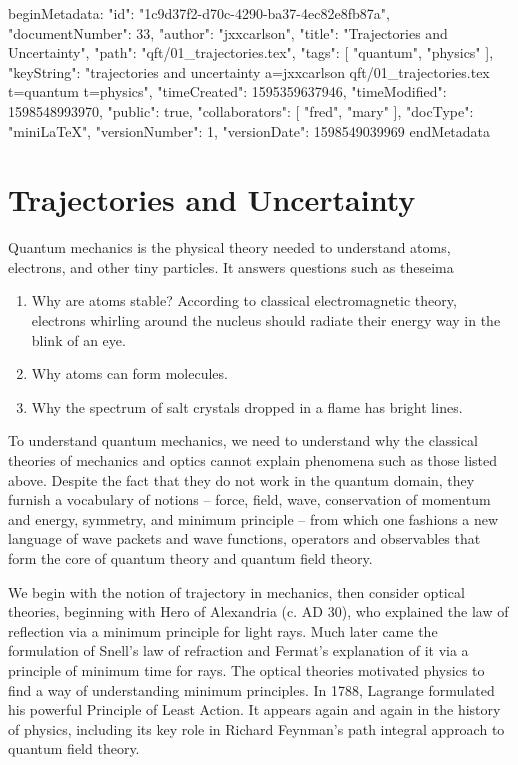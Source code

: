 beginMetadata:
{
    "id": "1c9d37f2-d70c-4290-ba37-4ec82e8fb87a",
    "documentNumber": 33,
    "author": "jxxcarlson",
    "title": "Trajectories and Uncertainty",
    "path": "qft/01_trajectories.tex",
    "tags": [
        "quantum",
        "physics"
    ],
    "keyString": "trajectories and uncertainty a=jxxcarlson qft/01_trajectories.tex t=quantum t=physics",
    "timeCreated": 1595359637946,
    "timeModified": 1598548993970,
    "public": true,
    "collaborators": [
        "fred",
        "mary"
    ],
    "docType": "miniLaTeX",
    "versionNumber": 1,
    "versionDate": 1598549039969
}
endMetadata

\maintableofcontents


\section{Trajectories and Uncertainty}


\innertableofcontents


Quantum mechanics is the physical theory needed to understand atoms, electrons, and other tiny particles.  It answers questions such as theseima

\begin{enumerate}
\item Why are atoms stable? According to classical electromagnetic theory, electrons whirling around the nucleus should radiate their energy way in the blink of an eye.

\item Why atoms can form molecules.

\item Why the spectrum of salt crystals dropped in a flame has bright lines.
\end{enumerate}

To understand quantum mechanics, we need to understand why the classical theories of mechanics and optics cannot explain phenomena such as those listed above.  Despite the fact that they do not work in the quantum domain, they furnish a vocabulary of notions -- force, field, wave, conservation of momentum and energy, symmetry, and minimum principle -- from which one fashions a new language of wave packets and wave functions, operators and observables that form the core of quantum theory and quantum field theory.

We begin with the notion of trajectory in mechanics, then consider optical theories, beginning with Hero of Alexandria (c. AD 30), who explained the law of reflection via a minimum principle for light rays.  Much later came the formulation of Snell's law of refraction and Fermat's explanation of it via a principle of minimum time for rays.  The optical theories motivated physics to find a way of understanding minimum principles.  In 1788, Lagrange formulated his powerful Principle of Least Action. It appears again and again in the history of physics, including its key role in Richard Feynman's path integral approach to quantum field theory. 

